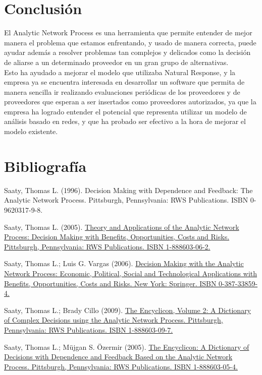 \documentclass[12pt,letterpaper]{article}
\begin{document}
\newpage
\section{Conclusión}
El Analytic Network Process es una herramienta que permite entender de mejor manera el problema que estamos enfrentando, y usado de manera correcta, puede ayudar además a resolver problemas tan complejos y delicados como la decisión de aliarse a un determinado proveedor en un gran grupo de alternativas.\\
Esto ha ayudado a mejorar el modelo que utilizaba Natural Response, y la empresa ya se encuentra interesada en desarrollar un software que permita de manera sencilla ir realizando evaluaciones periódicas de los proveedores y de proveedores que esperan a ser insertados como proveedores autorizados, ya que la empresa ha logrado entender el potencial que representa utilizar un modelo de análisis basado en redes, y que ha probado ser efectivo a la hora de mejorar el modelo existente.
\newpage
\section{Bibliografía}
\itemize
\item Saaty, Thomas L. (1996). Decision Making with Dependence and Feedback: The Analytic Network Process. Pittsburgh, Pennsylvania: RWS Publications. ISBN 0-9620317-9-8.
\item Saaty, Thomas L. (2005). \href{http://www.amazon.com/dp/1888603062}{Theory and Applications of the Analytic Network Process: Decision Making with Benefits, Opportunities, Costs and Risks. Pittsburgh, Pennsylvania: RWS Publications. ISBN 1-888603-06-2.}
\item Saaty, Thomas L.; Luis G. Vargas (2006). \href{http://www.amazon.com/dp/0387338594}{Decision Making with the Analytic Network Process: Economic, Political, Social and Technological Applications with Benefits, Opportunities, Costs and Risks. New York: Springer. ISBN 0-387-33859-4.}
\item Saaty, Thomas L.; Brady Cillo (2009). \href{http://rwspublications.com/}{The Encyclicon, Volume 2: A Dictionary of Complex Decisions using the Analytic Network Process. Pittsburgh, Pennsylvania: RWS Publications. ISBN 1-888603-09-7.}
\item Saaty, Thomas L.; Müjgan S. Özermir (2005). \href{http://www.amazon.com/dp/1888603054}{The Encyclicon: A Dictionary of Decisions with Dependence and Feedback Based on the Analytic Network Process. Pittsburgh, Pennsylvania: RWS Publications. ISBN 1-888603-05-4.}
\end{document}
